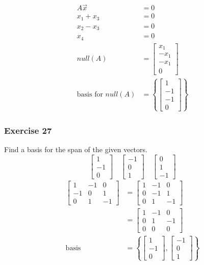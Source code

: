 \documentclass{math}
\begin{document}
\begin{align*}
  A\vec{x} &= 0 \\
  x_1+x_3 &= 0 \\
  x_2-x_3 &= 0 \\
  x_4 &= 0 \\
  null(A) &= \begin{bmatrix}
    x_1 \\ -x_1 \\ -x_1 \\ 0
  \end{bmatrix} \\
  \text{basis for } null(A) &= \left\{
    \begin{bmatrix}1 \\ -1 \\ -1 \\ 0\end{bmatrix}\right\}
\end{align*}

\subsubsection*{Exercise 27}
Find a basis for the span of the given vectors.
\[ \begin{bmatrix}1 \\ -1 \\ 0\end{bmatrix}\quad
  \begin{bmatrix}-1 \\ 0 \\ 1\end{bmatrix}\quad
  \begin{bmatrix}0 \\ 1 \\ -1\end{bmatrix} \]
\begin{align*}
  \begin{bmatrix}
    1 & -1 & 0 \\
    -1 & 0 & 1 \\
    0 & 1 & -1
  \end{bmatrix} &= \begin{bmatrix}
    1 & -1 & 0 \\
    0 & -1 & 1 \\
    0 & 1 & -1
  \end{bmatrix} \\
  &= \begin{bmatrix}
    1 & -1 & 0 \\
    0 & 1 & -1 \\
    0 & 0 & 0
  \end{bmatrix} \\
  \text{basis} &= \left\{\begin{bmatrix}
    1 \\ -1 \\ 0
  \end{bmatrix},\begin{bmatrix}
    -1 \\ 0 \\ 1
  \end{bmatrix}\right\}
\end{align*}
\end{document}
